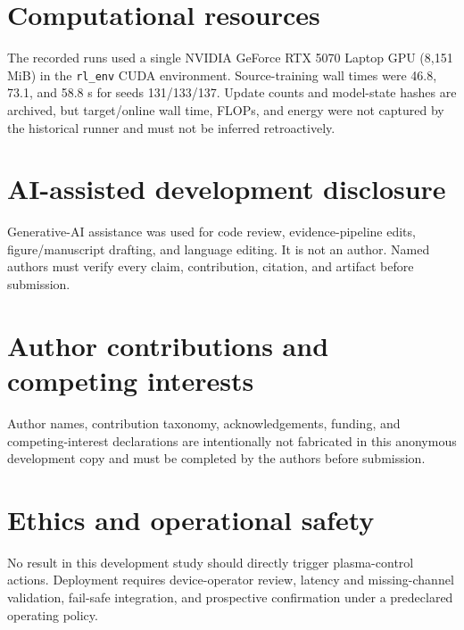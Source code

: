 \documentclass[10pt,twocolumn]{article}
\begin{document}
\section*{Computational resources}

The recorded runs used a single NVIDIA GeForce RTX 5070 Laptop GPU (8,151 MiB) in the \texttt{rl\_env} CUDA environment.  Source-training wall times were 46.8, 73.1, and 58.8 s for seeds 131/133/137.  Update counts and model-state hashes are archived, but target/online wall time, FLOPs, and energy were not captured by the historical runner and must not be inferred retroactively.

\section*{AI-assisted development disclosure}

Generative-AI assistance was used for code review, evidence-pipeline edits, figure/manuscript drafting, and language editing.  It is not an author.  Named authors must verify every claim, contribution, citation, and artifact before submission.

\section*{Author contributions and competing interests}

Author names, contribution taxonomy, acknowledgements, funding, and competing-interest declarations are intentionally not fabricated in this anonymous development copy and must be completed by the authors before submission.

\section*{Ethics and operational safety}

No result in this development study should directly trigger plasma-control actions.  Deployment requires device-operator review, latency and missing-channel validation, fail-safe integration, and prospective confirmation under a predeclared operating policy.



\end{document}
